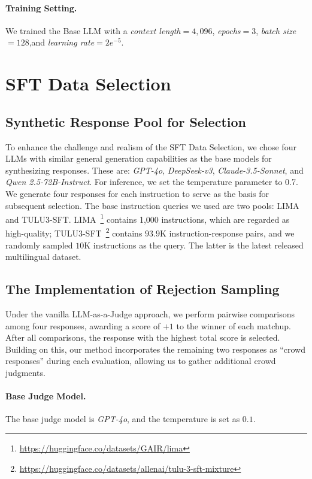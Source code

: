 \paragraph{Training Setting.} We trained the Base LLM with a \textit{context length}$=4,096$, \textit{epochs}$=3$, \textit{batch size}$=128$,and \textit{learning rate}$=2e^{-5}$.



\section{SFT Data Selection}
\label{sec:sft_data_selection}

\subsection{Synthetic Response Pool for Selection}
\label{subsec:synthetic}
To enhance the challenge and realism of the SFT Data Selection, we chose four LLMs with similar general generation capabilities as the base models for synthesizing responses. These are: \textit{GPT-4o}, \textit{DeepSeek-v3}, \textit{Claude-3.5-Sonnet}, and \textit{Qwen 2.5-72B-Instruct}. For inference, we set the temperature parameter to 0.7. We generate four responses for each instruction to serve as the basis for subsequent selection. The base instruction queries we used are two pools: LIMA and TULU3-SFT. LIMA~\footnote{\url{https://huggingface.co/datasets/GAIR/lima}} contains 1,000 instructions, which are regarded as high-quality; TULU3-SFT~\footnote{\url{https://huggingface.co/datasets/allenai/tulu-3-sft-mixture}} contains $93.9$K instruction-response pairs, and we randomly sampled $10$K instructions as the query. The latter is the latest released multilingual dataset.

\subsection{The Implementation of Rejection Sampling}
\label{subsec:implementation_rejection}

Under the vanilla LLM-as-a-Judge approach, we perform pairwise comparisons among four responses, awarding a score of $+1$ to the winner of each matchup. After all comparisons, the response with the highest total score is selected. Building on this, our method incorporates the remaining two responses as ``crowd responses'' during each evaluation, allowing us to gather additional crowd judgments.

\paragraph{Base Judge Model.} The base judge model is \textit{GPT-4o}, and the temperature is set as $0.1$.

